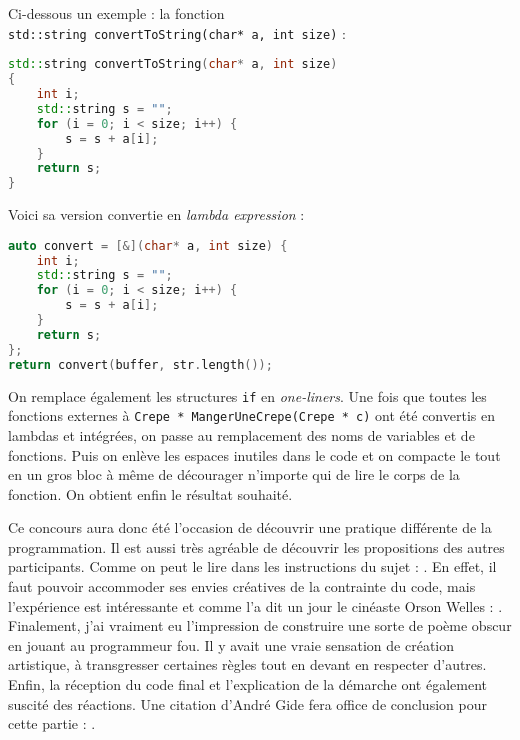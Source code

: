 \documentclass[12pt]{article} %
\begin{document}
Ci-dessous un exemple : la fonction \\ \verb|std::string convertToString(char* a, int size)| :
\begin{lstlisting}[language=C++]
std::string convertToString(char* a, int size)
{
    int i;
    std::string s = "";
    for (i = 0; i < size; i++) {
        s = s + a[i];
    }
    return s;
} 
\end{lstlisting}

Voici sa version convertie en \textit{lambda expression} :
\begin{lstlisting}[language=C++]
auto convert = [&](char* a, int size) {
    int i;
    std::string s = "";
    for (i = 0; i < size; i++) {
        s = s + a[i];
    }
    return s;
};
return convert(buffer, str.length());
\end{lstlisting}

On remplace également les structures \verb|if| en \textit{one-liners}. Une fois que toutes les fonctions externes à \verb|Crepe * MangerUneCrepe(Crepe * c)| ont été convertis en lambdas et intégrées, on passe au remplacement des noms de variables et de fonctions. Puis on enlève les espaces inutiles dans le code et on compacte le tout en un gros bloc à même de décourager n'importe qui de lire le corps de la fonction. On obtient enfin le résultat souhaité.

Ce concours aura donc été l'occasion de découvrir une pratique différente de la programmation. Il est aussi très agréable de découvrir les propositions des autres participants. Comme on peut le lire dans les instructions du sujet :  \cite{movaicode-enonce8}. En effet, il faut pouvoir accommoder ses envies créatives de la contrainte du code, mais l'expérience est intéressante et comme l'a dit un jour le cinéaste Orson Welles :  \cite{NKroll-artquote}. Finalement, j'ai vraiment eu l'impression de construire une sorte de poème obscur en jouant au programmeur fou. Il y avait une vraie sensation de création artistique, à transgresser certaines règles tout en devant en respecter d'autres. Enfin, la réception du code final et l'explication de la démarche ont également suscité des réactions. Une citation d'André Gide fera office de conclusion pour cette partie :  \cite{LeFigaro-artquote}.
\begin{lstlisting}[language=C++]

\end{lstlisting}
\end{document}
